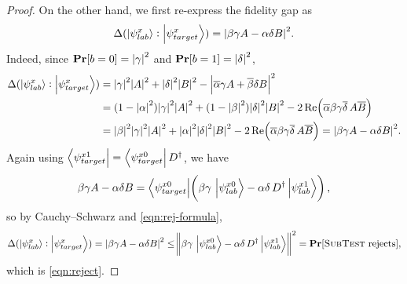 \begin{proof}
\medskip
On the other hand, we first re-express the fidelity gap as
\begin{equation}\label{eqn:delta-reexp}
    \Delta(\ket{\psi_{lab}^x}:\ket{\psi_{target}^x}) = {\left| \beta\gamma A - \alpha\delta B \right|}^2.
\end{equation}
Indeed, since $\operatorname{{\bf Pr}}[b=0] = {\left| \gamma \right|}^2$ and $\operatorname{{\bf Pr}}[b=1] = {\left| \delta \right|}^2$,
\begin{align*}
    \Delta(\ket{\psi_{lab}^x}:\ket{\psi_{target}^x})
        &= {\left| \gamma \right|}^2{\left| A \right|}^2 + {\left| \delta \right|}^2{\left| B \right|}^2 - {\left| \overline{\alpha}\gamma A + \overline{\beta}\delta B \right|}^2 \\
        &= (1-{\left| \alpha \right|}^2){\left| \gamma \right|}^2{\left| A \right|}^2 + (1-{\left| \beta \right|}^2){\left| \delta \right|}^2{\left| B \right|}^2 - 2\Re\!\left(\overline{\alpha}\beta\gamma\overline{\delta}\,A\overline{B}\right) \\
        &= {\left| \beta \right|}^2{\left| \gamma \right|}^2{\left| A \right|}^2 + {\left| \alpha \right|}^2{\left| \delta \right|}^2{\left| B \right|}^2 - 2\Re\!\left(\overline{\alpha}\beta\gamma\overline{\delta}\,A\overline{B}\right) = {\left| \beta\gamma A - \alpha\delta B \right|}^2.
\end{align*}
Again using $\bra{\psi_{target}^{x1}} = \bra{\psi_{target}^{x0}}D^\dagger$, we have
\[
    \beta\gamma A - \alpha\delta B = \bra{\psi_{target}^{x0}}\!\left(\beta\gamma\,\ket{\psi_{lab}^{x0}} - \alpha\delta\,D^\dagger\ket{\psi_{lab}^{x1}}\right),
\]
so by Cauchy--Schwarz and \eqref{eqn:rej-formula},
\[
    \Delta(\ket{\psi_{lab}^x}:\ket{\psi_{target}^x}) = {\left| \beta\gamma A - \alpha\delta B \right|}^2 \leq \norm{\beta\gamma\,\ket{\psi_{lab}^{x0}} - \alpha\delta\,D^\dagger\ket{\psi_{lab}^{x1}}}^2 = \operatorname{{\bf Pr}}[\textsc{SubTest}\text{ rejects}],
\]
which is \eqref{eqn:reject}.
\end{proof}